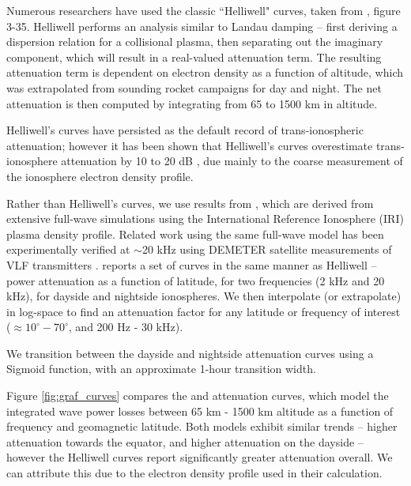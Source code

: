 Numerous researchers \citep{Lauben1998, Bortnik2005, Kulkarni2009, Graf2013} have used the classic ``Helliwell" curves, taken from \cite{Helliwell1965}, figure 3-35. Helliwell performs an analysis similar to Landau damping -- first deriving a dispersion relation for a collisional plasma, then separating out the imaginary component, which will result in a real-valued attenuation term. The resulting attenuation term is dependent on electron density as a function of altitude, which was extrapolated from sounding rocket campaigns for day and night. The net attenuation is then computed by integrating from 65 to 1500 km in altitude.

Helliwell's curves have persisted as the default record of trans-ionospheric attenuation; however it has been shown that Helliwell's curves overestimate trans-ionosphere attenuation by 10 to 20 dB \citep{Starks2008}, due mainly to the coarse measurement of the ionosphere electron density profile.

Rather than Helliwell's curves, we use results from \cite{Graf2013}, which are derived from extensive full-wave simulations using the International Reference Ionosphere (IRI) plasma density profile. Related work using the same full-wave model has been experimentally verified at $\sim$20 kHz using DEMETER satellite measurements of VLF transmitters \citep{Cohen2012}. \citeauthor{Graf2013} reports a set of curves in the same manner as Helliwell -- power attenuation as a function of latitude, for two frequencies (2 kHz and 20 kHz), for dayside and nightside ionospheres. We then interpolate (or extrapolate) in log-space to find an attenuation factor for any latitude or frequency of interest ($\approx 10^\circ - 70^\circ$, and 200 Hz - 30 kHz).

We transition between the dayside and nightside attenuation curves using a Sigmoid function, with an approximate 1-hour transition width.

Figure \ref{fig:graf_curves} compares the \cite{Graf2013} and \cite{Helliwell1965} attenuation curves, which model the integrated wave power losses between 65 km - 1500 km altitude as a function of frequency and geomagnetic latitude. Both models exhibit similar trends -- higher attenuation towards the equator, and higher attenuation on the dayside -- however the Helliwell curves report significantly greater attenuation overall. We can attribute this due to the electron density profile used in their calculation.


